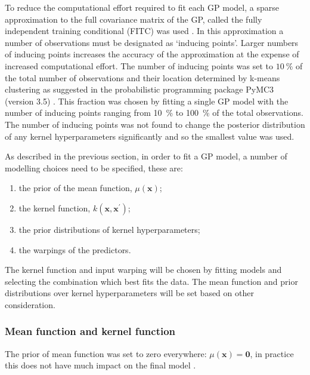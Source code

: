 To reduce the computational effort required to fit each GP model, a sparse approximation to the full covariance matrix of the GP, called the fully independent training conditional (FITC) was used \cite{quinonero-candelaUnifyingViewSparse2005}. In this approximation a number of observations must be designated as `inducing points'. Larger numbers of inducing points increases the accuracy of the approximation at the expense of increased computational effort. The number of inducing points was set to $\SI{10}{\percent}$ of the total number of observations and their location determined by k-means clustering as suggested in the probabilistic programming package PyMC3 (version 3.5) \cite{salvatierProbabilisticProgrammingPython2016}. This fraction was chosen by fitting a single GP model with the number of inducing points ranging from \SI{10}{\percent} to \SI{100}{\percent} of the total observations. The number of inducing points was not found to change the posterior distribution of any kernel hyperparameters significantly and so the smallest value was used. 

As described in the previous section, in order to fit a GP model, a number of modelling choices need to be specified, these are: 
\begin{enumerate}
    \item the prior of the mean function, $\mu(\mathbf{x})$;
    \item the kernel function, $k(\mathbf{x}, \mathbf{x}^{\prime})$;
    \item the prior distributions of kernel hyperparameters;
    \item the warpings of the predictors.
\end{enumerate}

The kernel function and input warping will be chosen by fitting models and selecting the combination which best fits the data. The mean function and prior distributions over kernel hyperparameters will be set based on other consideration.

\subsubsection*{Mean function and kernel function}

The prior of mean function  was set to zero everywhere: $\mu(\mathbf{x})=\mathbf{0}$, in practice this does not have much impact on the final model \cite{brochuTutorialBayesianOptimization2010}. 

